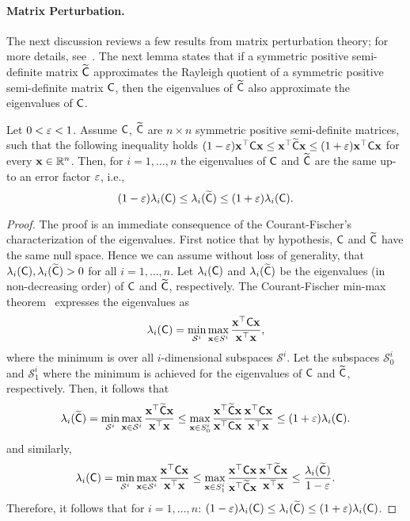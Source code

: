 \paragraph{Matrix Perturbation.}
%
The next discussion reviews a few results from matrix perturbation theory; for more details, see~\cite{book:perturbation:stewart,book:GVL,book:matrix:Bhatia}. The next lemma states that if a symmetric positive semi-definite matrix $\widetilde{{\mathsf{C} }}$ approximates the Rayleigh quotient of a symmetric positive semi-definite matrix ${\mathsf{C} }$, then the eigenvalues of $\widetilde{{\mathsf{C} }}$ also approximate the eigenvalues of ${\mathsf{C} }$.
\begin{lemma}\label{lem:rayleight_to_eig}
Let $0<\varepsilon<1$. Assume ${\mathsf{C} }$, $\widetilde{{\mathsf{C} }}$ are $n\times n$ symmetric positive semi-definite matrices, such that the following inequality holds $ (1-\varepsilon)\mathbf{x}^\top {\ensuremath{\mathsf{C} }} \mathbf{x} \leq \mathbf{x}^\top \widetilde{{\mathsf{C} }} \mathbf{x} \leq (1+\varepsilon) \mathbf{x}^\top {\ensuremath{\mathsf{C} }} \mathbf{x}$ for every $\mathbf{x}\in{\mathbb{R}^n}$. Then, for $i=1,\dots, n$ the eigenvalues of ${\mathsf{C} }$ and $\widetilde{{\mathsf{C} }}$ are the same up-to an error factor $\varepsilon$, i.e.,
%
\[(1-\varepsilon)\lambda_i({\mathsf{C} }) \leq \lambda_i(\widetilde{{\mathsf{C} }}) \leq (1+\varepsilon) \lambda_i({\mathsf{C} }).\]
%
\end{lemma}
\begin{proof}
The proof is an immediate consequence of the Courant-Fischer's characterization of the eigenvalues. First notice that by hypothesis, ${\mathsf{C} }$ and $\widetilde{{\mathsf{C} }}$ have
the same null space. Hence we can assume without loss of generality, that $\lambda_i({\mathsf{C} }), \lambda_i(\widetilde{{\mathsf{C} }}) > 0$ for all $i=1,\dots, n$. Let $\lambda_i({\mathsf{C} })$ and $\lambda_i(\widetilde{{\mathsf{C} }})$ be the eigenvalues (in non-decreasing order) of ${\mathsf{C} }$ and $\widetilde{{\mathsf{C} }}$, respectively. The Courant-Fischer min-max theorem~\cite[p.~394]{book:GVL} expresses the eigenvalues as
\begin{equation}\label{eqn:Courant_Fischer}
\lambda_i({\mathsf{C} }) = \min_{\mathcal{S}^i}\max_{\mathbf{x}\in{S^i} } \frac{\mathbf{x}^\top {\ensuremath{\mathsf{C} }} \mathbf{x}}{\mathbf{x}^\top \mathbf{x}},
\end{equation}
where the minimum is over all $i$-dimensional subspaces $\mathcal{S}^i$. Let the subspaces $\mathcal{S}^{i}_0$ and $\mathcal{S}^i_1$ where the minimum is achieved for the eigenvalues of ${\mathsf{C} }$ and $\widetilde{{\mathsf{C} }}$, respectively. Then, it follows that
%
\[
\lambda_i (\widetilde{{\mathsf{C} }}) = \min_{\mathcal{S}^i}\max_{\mathbf{x}\in{\mathcal{S}^i} } \frac{\mathbf{x}^\top \widetilde{{\mathsf{C} }} \mathbf{x}}{\mathbf{x}^\top \mathbf{x}}\leq \max_{\mathbf{x}\in{S^i_0} } \frac{\mathbf{x}^\top \widetilde{{\mathsf{C} }} \mathbf{x}}{\mathbf{x}^\top {\ensuremath{\mathsf{C} }} \mathbf{x}} \frac{\mathbf{x}^\top {\ensuremath{\mathsf{C} }} \mathbf{x}}{\mathbf{x}^\top \mathbf{x}} \leq (1+\varepsilon)\lambda_i ({\mathsf{C} }).
\]
and similarly,
\[
\lambda_i ({\mathsf{C} }) = \min_{\mathcal{S}^i}\max_{\mathbf{x}\in{\mathcal{S}^i} } \frac{\mathbf{x}^\top {\ensuremath{\mathsf{C} }} \mathbf{x}}{\mathbf{x}^\top \mathbf{x}}\leq \max_{\mathbf{x}\in{S^i_1} } \frac{\mathbf{x}^\top {\ensuremath{\mathsf{C} }} \mathbf{x}}{\mathbf{x}^\top \widetilde{{\mathsf{C} }} \mathbf{x}} \frac{\mathbf{x}^\top \widetilde{{\mathsf{C} }} \mathbf{x}}{\mathbf{x}^\top \mathbf{x}} \leq \frac{\lambda_i (\widetilde{{\mathsf{C} }})}{1-\varepsilon}.
\]
Therefore, it follows that for $i=1,\dots , n$: $(1- \varepsilon) \lambda_i({\mathsf{C} }) \leq \lambda_i(\widetilde{{\mathsf{C} }}) \leq (1+\varepsilon) \lambda_i({\mathsf{C} })$.
\end{proof}
